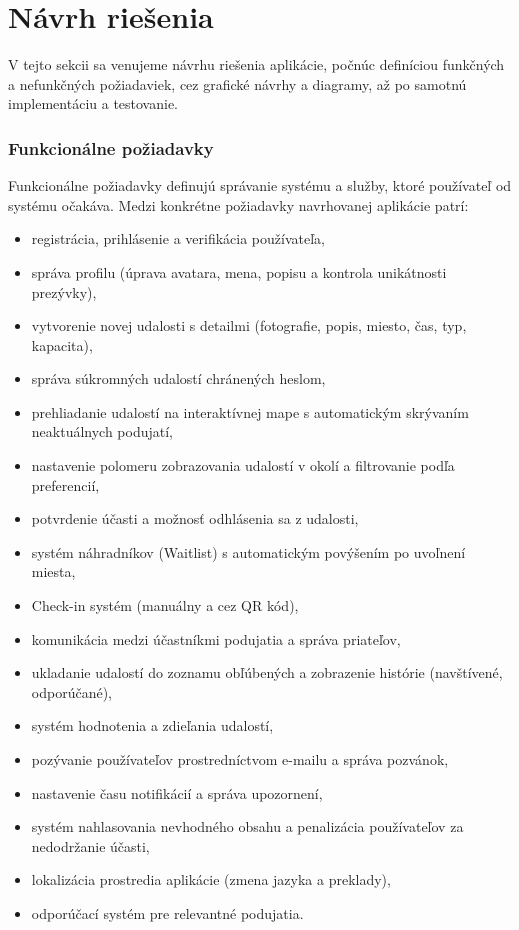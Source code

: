 \section{Návrh riešenia}
V tejto sekcii sa venujeme návrhu riešenia aplikácie, počnúc definíciou funkčných a
 nefunkčných požiadaviek, cez grafické návrhy a diagramy, až po samotnú implementáciu a testovanie.

\subsubsection{Funkcionálne požiadavky}
Funkcionálne požiadavky definujú správanie systému a služby, ktoré používateľ od systému očakáva. Medzi konkrétne požiadavky navrhovanej aplikácie patrí:

\begin{itemize}[noitemsep]
    \item registrácia, prihlásenie a verifikácia používateľa,
    \item správa profilu (úprava avatara, mena, popisu a kontrola unikátnosti prezývky),
    \item vytvorenie novej udalosti s detailmi (fotografie, popis, miesto, čas, typ, kapacita),
    \item správa súkromných udalostí chránených heslom,
    \item prehliadanie udalostí na interaktívnej mape s automatickým skrývaním neaktuálnych podujatí,
    \item nastavenie polomeru zobrazovania udalostí v okolí a filtrovanie podľa preferencií,
    \item potvrdenie účasti a možnosť odhlásenia sa z udalosti,
    \item systém náhradníkov (Waitlist) s automatickým povýšením po uvoľnení miesta,
    \item Check-in systém (manuálny a cez QR kód),
    \item komunikácia medzi účastníkmi podujatia a správa priateľov,
    \item ukladanie udalostí do zoznamu obľúbených a zobrazenie histórie (navštívené, odporúčané),
    \item systém hodnotenia a zdieľania  udalostí,
    \item pozývanie používateľov prostredníctvom e-mailu a správa pozvánok,
    \item nastavenie času notifikácií a správa upozornení,
    \item systém nahlasovania nevhodného obsahu a penalizácia používateľov za nedodržanie účasti,
    \item lokalizácia prostredia aplikácie (zmena jazyka a preklady),
    \item odporúčací systém pre relevantné podujatia.
\end{itemize}

